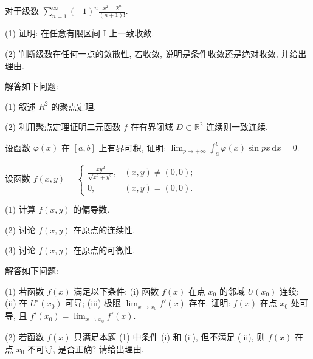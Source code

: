对于级数 $\sum_{n=1}^{\infty} (-1)^{n} \frac{x^{2} + 2^{n}}{(n+1)!}$.\par
(1) 证明: 在任意有限区间 I 上一致收敛.\par
(2) 判断级数在任何一点的敛散性, 若收敛, 说明是条件收敛还是绝对收敛, 并给出理由.\par
解答如下问题:\par
(1) 叙述  $R^{2}$  的聚点定理.\par
(2) 利用聚点定理证明二元函数 $f$ 在有界闭域 $D \subset \mathbb{R}^2$ 连续则一致连续.\par
设函数 $\varphi(x)$ 在 $[a, b]$ 上有界可积, 证明: $\lim_{p \to +\infty} \int_{a}^{b} \varphi(x) \sin px \, \mathrm{d}x = 0$.\par
设函数 $f(x, y) = \begin{cases} \frac{xy^2}{\sqrt{x^2 + y^2}}, & (x, y) \neq (0, 0); \\ 0, & (x, y) = (0, 0). \end{cases}$\par
(1) 计算  $f(x,y)$  的偏导数.\par
(2) 讨论 $f(x, y)$ 在原点的连续性.\par
(3) 讨论 $f(x, y)$ 在原点的可微性.\par
解答如下问题:\par
(1) 若函数 $f(x)$ 满足以下条件: (i) 函数 $f(x)$ 在点 $x_0$ 的邻域 $U(x_0)$ 连续; (ii) 在 $U^\circ(x_0)$ 可导; (iii) 极限 $\lim_{x \to x_0} f'(x)$ 存在. 证明: $f(x)$ 在点 $x_0$ 处可导, 且 $f'(x_0) = \lim_{x \to x_0} f'(x)$.\par
(2) 若函数 $f(x)$ 只满足本题 (1) 中条件 (i) 和 (ii), 但不满足 (iii), 则 $f(x)$ 在点 $x_0$ 不可导, 是否正确? 请给出理由.\par
